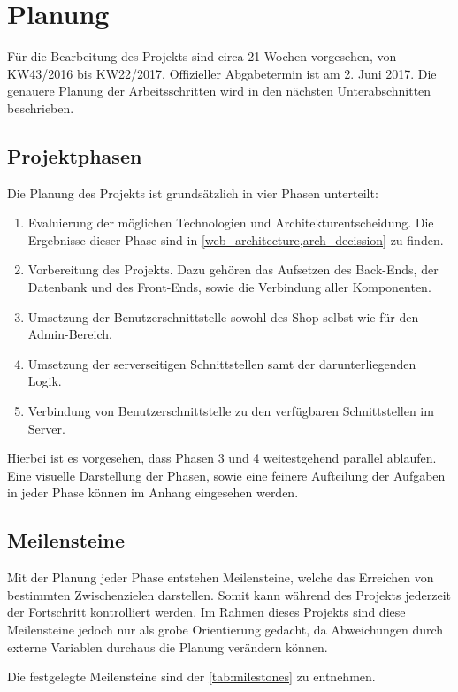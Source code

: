 \section{Planung} \thispagestyle{nomarkstyle}
Für die Bearbeitung des Projekts sind circa 21 Wochen vorgesehen, von KW43/2016 bis KW22/2017. Offizieller Abgabetermin ist am 2. Juni 2017. Die genauere Planung der Arbeitsschritten wird in den nächsten Unterabschnitten beschrieben.

\subsection{Projektphasen}
Die Planung des Projekts ist grundsätzlich in vier Phasen unterteilt:
\begin{enumerate}
	\item Evaluierung der möglichen Technologien und Architekturentscheidung. Die Ergebnisse dieser Phase sind in \cref{web_architecture,arch_decission} zu finden.
	\item Vorbereitung des Projekts. Dazu gehören das Aufsetzen des Back-Ends, der Datenbank und des Front-Ends, sowie die Verbindung aller Komponenten.
	\item Umsetzung der  Benutzerschnittstelle sowohl des Shop selbst wie für den Admin-Bereich.
	\item Umsetzung der serverseitigen Schnittstellen samt der darunterliegenden Logik.
	\item Verbindung von Benutzerschnittstelle zu den verfügbaren Schnittstellen im Server.
\end{enumerate}

Hierbei ist es vorgesehen, dass Phasen 3 und 4 weitestgehend parallel ablaufen. Eine visuelle Darstellung der Phasen, sowie eine feinere Aufteilung der Aufgaben in jeder Phase können im Anhang eingesehen werden.

\subsection{Meilensteine}
Mit der Planung jeder Phase entstehen Meilensteine, welche das Erreichen von bestimmten Zwischenzielen darstellen. Somit kann während des Projekts jederzeit der Fortschritt kontrolliert werden. Im Rahmen dieses Projekts sind diese Meilensteine jedoch nur als grobe Orientierung gedacht, da Abweichungen durch externe Variablen durchaus die Planung verändern können.

Die festgelegte Meilensteine sind der \cref{tab:milestones} zu entnehmen.

